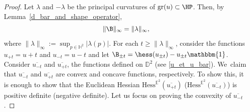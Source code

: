 \begin{proof}
Let \(\lambda\) and \(-\lambda\) be the principal curvatures of \(\mathrm{gr}(u) \subset \HP\). Then, by Lem\-ma~\ref{d_bar_and_shape_operator},
\[
\lVert \B \rVert_{\infty} = \lVert \lambda \rVert_{\infty},
\]
where \(\lVert \lambda \rVert_{\infty} := \sup_{p \in \mathbb{H}^2} \lvert \lambda(p) \rvert.\)
For each \(t \geq \lVert \lambda \rVert_{\infty} \), consider the functions \(u_{{+t}} = u + t \) and \(u_{{-t}} = u - t \) and let \(\B_{\pm t} = \hess(u_{\pm t}) - u_{\pm t} \mathbbm{1} \). Consider \(\overline{u_{{-t}}} \) and \(\overline{u_{{+t}}} \), the functions defined on \(\mathbb{D}^2 \) (see \eqref{u_et_u_bar}). We~claim that \(\overline{u_{{-t}}} \) and \(\overline{u_{{+t}}} \) are convex and concave functions, respectively. To show this, it is enough to show that the Euclidean Hessian \(\mathrm{Hess}^{\mathbb{E}^2}(\overline{u_{{+t}}}) \) (\resp \(\mathrm{Hess}^{\mathbb{E}^2}(\overline{u_{{-t}}}) \)) is positive definite (\resp negative definite). Let us focus on proving the convexity of \(\overline{u_{{-t}}} \).


\end{proof}
